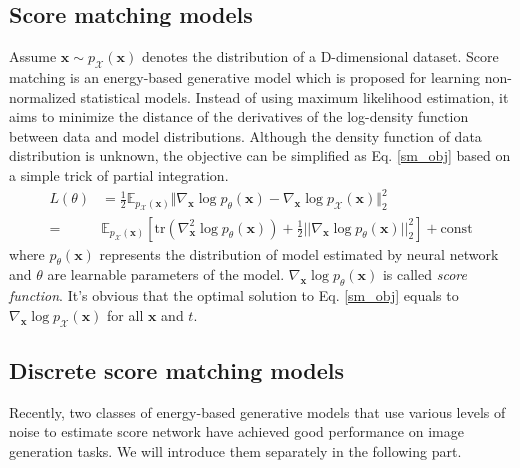 \subsection{Score matching models}
Assume $\textbf{x} \sim p_{\mathcal{X}}(\textbf{x})$ denotes the distribution of a D-dimensional dataset. Score matching \cite{hyvarinen2005estimation} is an energy-based generative model which is proposed for learning non-normalized statistical models. Instead of using maximum likelihood estimation, it aims to minimize the distance of the derivatives of the log-density function between data and model distributions. Although the density function of data distribution is unknown, the objective can be simplified as Eq. \ref{sm_obj} based on a simple trick of partial integration. 
\begin{equation}\label{sm_obj}
	\begin{aligned}
		L(\theta) &= \frac{1}{2}\mathbb{E}_{p_{\mathcal{X}}(\textbf{x})}\Vert\nabla_\textbf{x}\log p_{\theta}(\textbf{x}) - \nabla_\textbf{x}\log p_{\mathcal{X}}(\textbf{x})\Vert_2^2\\
		=& \mathbb{E}_{p_{\mathcal{X}}(\textbf{x})}[\text{tr}(\nabla_\textbf{x}^2\log p_{\theta}(\textbf{x})) + \frac{1}{2}||\nabla_\textbf{x} \log p_{\theta}(\textbf{x})||_2^2] + \text{const}
	\end{aligned}
\end{equation}
where $p_{\theta}(\textbf{x})$ represents the distribution of model estimated by neural network and $\theta$ are learnable parameters of the model. $\nabla_{\textbf{x}}\log p_{\theta}(\textbf{x})$ is called \textit{score function}. It's obvious that the optimal solution to Eq. \ref{sm_obj} equals to $\nabla_\textbf{x}\log p_{\mathcal{X}}(\textbf{x})$ for all $\textbf{x}$ and $t$.

\subsection{Discrete score matching models}
Recently, two classes of energy-based generative models that use various levels of noise to estimate score network have achieved good performance on image generation tasks. We will introduce them separately in the following part.

